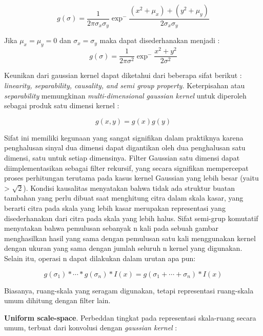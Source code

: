 \begin{equation*}
g(\sigma) = \frac{1}{2\pi\sigma_{x}\sigma_{y}}\exp^-\frac{(x^2+\mu_{x})+(y^2+\mu_{y})}{2\sigma_{x}\sigma_{y}}
\end{equation*}

Jika \(\mu_{x} = \mu_{y} = 0\) dan \(\sigma_{x} = \sigma_{y}\) maka dapat disederhanakan menjadi :
\begin{equation}
g(\sigma) = \frac{1}{2\pi\sigma^2}\exp^-\frac{x^2+y^2}{2\sigma^2}
\label{eq:gaussian kernel}
\end{equation}

Keunikan dari gaussian kernel dapat diketahui dari beberapa sifat berikut : 
\emph{linearity, separability, causality, and semi group property.} Keterpisahan 
atau \emph{separability} memungkinan \emph{multi-dimensional gaussian kernel} 
untuk diperoleh sebagai produk satu dimensi kernel : 

\begin{equation*}
  g(x,y) = g(x)g(y)
\end{equation*}

Sifat ini memiliki kegunaan yang sangat signifikan dalam praktiknya karena penghalusan sinyal dua dimensi 
dapat digantikan oleh dua penghalusan satu dimensi, satu untuk setiap dimensinya. 
Filter Gaussian satu dimensi dapat diimplementasikan sebagai filter rekursif, yang secara signifikan mempercepat proses 
perhitungan terutama pada kasus kernel Gaussian yang lebih besar (yaitu > \( \sqrt{2}\)). 
Kondisi kausalitas menyatakan bahwa tidak ada struktur buatan tambahan yang perlu dibuat saat menghitung citra dalam skala kasar, 
yang berarti citra pada skala yang lebih kasar merupakan representasi yang disederhanakan dari citra pada skala yang lebih halus. 
Sifat semi-grup komutatif menyatakan bahwa pemulusan sebanyak n kali pada sebuah gambar menghasilkan hasil yang sama dengan pemulusan satu kali 
menggunakan kernel dengan ukuran yang sama dengan jumlah seluruh n kernel yang digunakan. 
Selain itu, operasi n dapat dilakukan dalam urutan apa pun:

\begin{equation*}
g(\sigma_{1}) * \cdots * g(\sigma_{n}) * I(x) = g(\sigma_{1} + \cdots + \sigma_{n}) * I(x)
\end{equation*}

Biasanya, ruang-skala yang seragam digunakan, tetapi representasi ruang-skala umum dihitung dengan filter lain.

\textbf{Uniform scale-space}. Perbeddan tingkat pada representasi skala-ruang
secara umum, terbuat dari konvolusi dengan \emph{gaussian kernel} :

